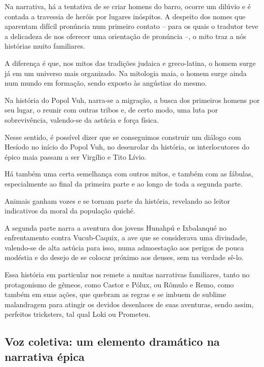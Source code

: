 \documentclass[12pt]{extarticle}
\begin{document}


Na narrativa, há a tentativa de se criar homens do barro, ocorre um
dilúvio e é contada a travessia de heróis por lugares inóspitos. A
despeito dos nomes que aparentam difícil pronúncia num primeiro contato
-- para os quais o tradutor teve a delicadeza de nos oferecer uma
orientação de pronúncia --, o mito traz a nós histórias muito
familiares.

A diferença é que, nos mitos das tradições judaica e greco-latina, o
homem surge já em um universo mais organizado. Na mitologia maia, o
homem surge ainda num mundo em formação, sendo exposto às angústias do
mesmo.

Na história do Popol Vuh, narra-se a migração, a busca dos primeiros
homens por seu lugar, o reunir com outras tribos e, de certo modo, uma
luta por sobrevivência, valendo-se da astúcia e força física.

Nesse sentido, é possível dizer que se conseguimos construir um diálogo
com Hesíodo no início do Popol Vuh, no desenrolar da história, os
interlocutores do épico maia passam a ser Virgílio e Tito Lívio.

Há também uma certa semelhança com outros mitos, e também com as
fábulas, especialmente ao final da primeira parte e ao longo de toda a
segunda parte.

Animais ganham vozes e se tornam parte da história, revelando ao leitor
indicativos da moral da população quiché.

A segunda parte narra a aventura dos jovens Hunahpú e Ixbalanqué no
enfrentamento contra Vucub-Caquix, a ave que se considerava uma
divindade, valendo-se de alta astúcia para isso, numa admoestação aos
perigos de pouca modéstia e do desejo de se colocar próximo aos deuses,
sem na verdade sê-lo.




Essa história em particular nos remete a muitas narrativas familiares,
tanto no protagonismo de gêmeos, como Castor e Pólux, ou Rômulo e Remo,
como também em suas ações, que quebram as regras e se imbuem de sublime
malandragem para atingir os devidos desenlaces de suas aventuras, sendo
assim, perfeitos tricksters, tal qual Loki ou Prometeu.

\subsection{Voz coletiva: um elemento dramático na narrativa épica}
\end{document}
